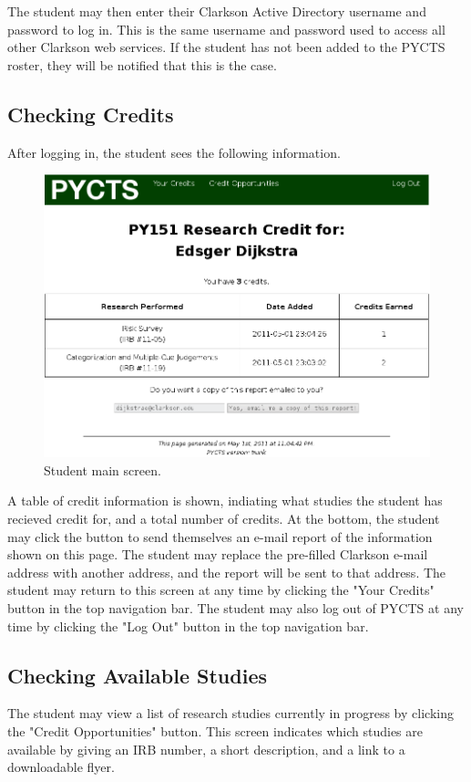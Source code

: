 \documentclass[letterpaper,titlepage]{article}
\begin{document}
The student may then enter their Clarkson Active Directory username and password to log in. This is the same username and password used to access all other Clarkson web services. If the student has not been added to the PYCTS roster, they will be notified that this is the case.

\newpage
\subsection{Checking Credits}
After logging in, the student sees the following information.

\begin{figure}[H]
\includegraphics[width=\textwidth]{images/student_main-screen.png}
\caption{Student main screen.}
\label{student_main-screen}
\end{figure}

A table of credit information is shown, indiating what studies the student has recieved credit for, and a total number of credits. At the bottom, the student may click the button to send themselves an e-mail report of the information shown on this page. The student may replace the pre-filled Clarkson e-mail address with another address, and the report will be sent to that address. The student may return to this screen at any time by clicking the "Your Credits" button in the top navigation bar. The student may also log out of PYCTS at any time by clicking the "Log Out" button in the top navigation bar.

\subsection{Checking Available Studies}
The student may view a list of research studies currently in progress by clicking the "Credit Opportunities" button. This screen indicates which studies are available by giving an IRB number, a short description, and a link to a downloadable flyer.
\end{document}
